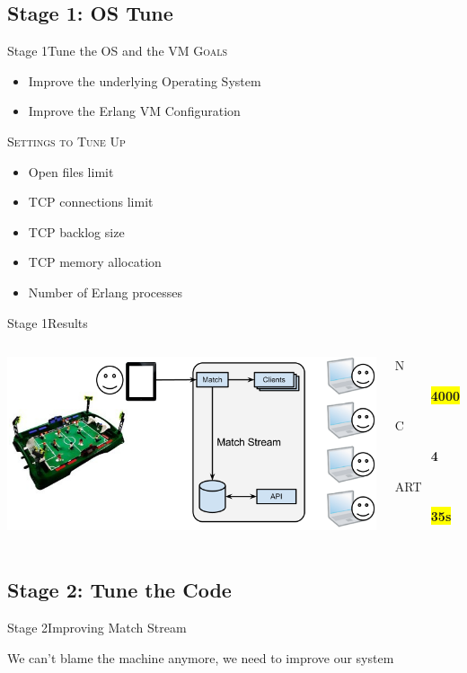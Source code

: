 \documentclass[utf8]{beamer}
\begin{document}
\subsection{Stage 1: OS Tune}
\begin{frame}{Stage 1}{Tune the OS and the VM}
	\textsc{Goals}
	\begin{itemize}
		\item Improve the underlying Operating System
		\item Improve the Erlang VM Configuration
	\end{itemize}
	\pause
	\textsc{Settings to Tune Up}
	\begin{itemize}
		\item Open files limit
		\item TCP connections limit
		\item TCP backlog size
		\item TCP memory allocation
		\item Number of Erlang processes
	\end{itemize}
\end{frame}
\begin{frame}{Stage 1}{Results}
	\begin{columns}
			\includegraphics[top=-1,width=\textwidth]{img/results-2.png}
			\begin{description}
				\item[N] \textbf{\colorbox{yellow}{\Large 4000}}
				\item[C] \textbf{\color{red}\Large 4}
				\item[ART] \textbf{\colorbox{yellow}{\color{red}\Large 35s}}
			\end{description}
	\end{columns}
\end{frame}

\subsection{Stage 2: Tune the Code}
\begin{frame}{Stage 2}{Improving Match Stream}
	\begin{center}
		\Large We can't blame the machine anymore, we need to improve \alert{our system}
	\end{center}
\end{frame}
\end{document}
